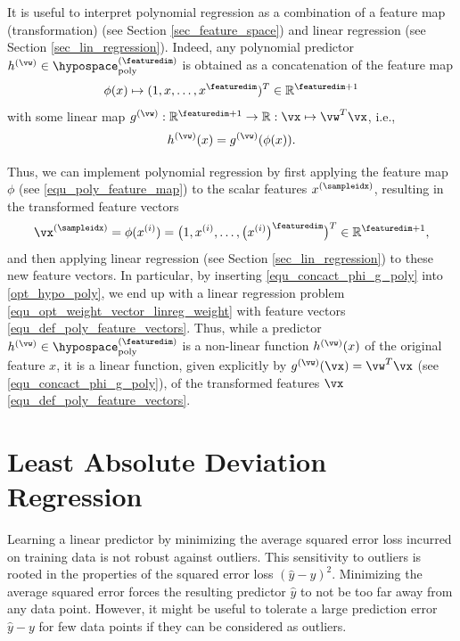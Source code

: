 \documentclass[12pt]{report}
\begin{document}
It is useful to interpret polynomial regression as a combination of a feature map (transformation) 
(see Section \ref{sec_feature_space}) and linear regression (see Section \ref{sec_lin_regression}). 
Indeed, any polynomial predictor $h^{(\vw)} \in \hypospace_{\rm poly}^{(\featuredim)}$ is obtained as 
a concatenation of the feature map  
\begin{equation}
\label{equ_poly_feature_map} 
\phi(x) \mapsto (1,x,\ldots,x^{\featuredim})^{T} \in \mathbb{R}^{\featuredim+1}
\end{equation}
with some linear map $g^{(\vw)}: \mathbb{R}^{\featuredim+1} \rightarrow \mathbb{R}: \vx \mapsto \vw^{T} \vx$, i.e., 
\begin{equation}
\label{equ_concact_phi_g_poly}
h^{(\vw)}(x) = g^{(\vw)}(\phi(x)). 
\end{equation}

Thus, we can implement polynomial regression by first applying the feature map $\phi$ (see \eqref{equ_poly_feature_map}) 
to the scalar features $x^{(\sampleidx)}$, resulting in the transformed feature vectors 
\begin{equation} 
\label{equ_def_poly_feature_vectors}
\vx^{(\sampleidx)} = \phi(x^{(i)}) = \big(1,x^{(i)},\ldots,\big( x^{(i)} \big)^{\featuredim} \big)^{T} \in \mathbb{R}^{\featuredim+1}, 
\end{equation} 
and then applying linear regression  (see Section \ref{sec_lin_regression}) to these new feature 
vectors. In particular, by inserting \eqref{equ_concact_phi_g_poly} into \eqref{opt_hypo_poly}, we 
end up with a linear regression problem \eqref{equ_opt_weight_vector_linreg_weight} with feature 
vectors \eqref{equ_def_poly_feature_vectors}. Thus, while a predictor $h^{(\vw)} \in \hypospace_{\rm poly}^{(\featuredim)}$ 
is a non-linear function $h^{(\vw)}(x)$ of the original feature $x$, it is a linear function, given explicitly 
by $g^{(\vw)}(\vx) = \vw^{T}\vx$ (see \eqref{equ_concact_phi_g_poly}), of the transformed features $\vx$ \eqref{equ_def_poly_feature_vectors}. 

\section{Least Absolute Deviation Regression}
\label{sec_lad}

Learning a linear predictor by minimizing the average squared error loss incurred 
on training data is not robust against outliers. This sensitivity to outliers is rooted 
in the properties of the squared error loss $(\hat{y} - y)^{2}$. Minimizing the 
average squared error forces the resulting predictor $\hat{y}$ to not be too far 
away from any data point. However, it might be useful to tolerate a large prediction 
error $\hat{y}-y$ for few data points if they can be considered as outliers. 
\end{document}
